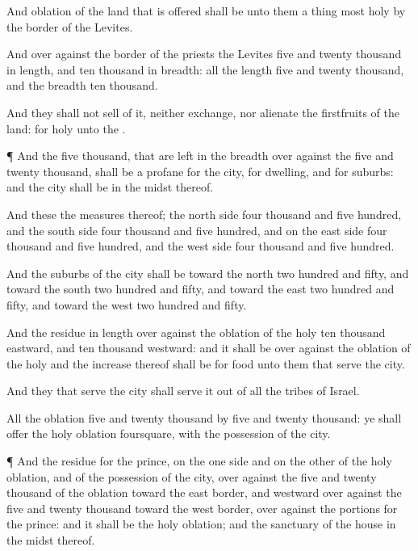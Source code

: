 {And
{}
oblation of the
land that is
offered shall be unto them a thing
most
holy by the
border of the
Levites.

And over
against the
border of the
priests the
Levites
{}
five and
twenty
thousand in
length, and
ten
thousand in
breadth: all the
length
{}
five and
twenty
thousand, and the
breadth
ten
thousand.

And they shall not
sell of it, neither
exchange, nor
alienate the
firstfruits of the
land: for
{}
holy unto the
{}.


\par }{\PP {}¶ And the
five
thousand, that are
left in the
breadth over
against the
five and
twenty
thousand, shall be a
profane
{} for the
city, for
dwelling, and for
suburbs: and the
city shall be in the
midst thereof.

And these
{} the
measures thereof; the
north
side
four
thousand and
five
hundred, and the
south
side
four
thousand and
five
hundred, and on the
east
side
four
thousand and
five
hundred, and the
west
side
four
thousand and
five
hundred.

And the
suburbs of the
city shall be toward the
north two
hundred and
fifty, and toward the
south two
hundred and
fifty, and toward the
east two
hundred and
fifty, and toward the
west two
hundred and
fifty.

And the
residue in
length over
against the
oblation of the
holy
{}
ten
thousand
eastward, and
ten
thousand
westward: and it shall be over
against the
oblation of the
holy
{} and the
increase thereof shall be for
food unto them that
serve the
city.

And they that
serve the
city shall
serve it out of all the
tribes of
Israel.

All the
oblation
{}
five and
twenty
thousand by
five and
twenty
thousand: ye shall
offer the
holy
oblation
foursquare, with the
possession of the
city.


\par }{\PP {}¶ And the
residue
{} for the
prince, on the one side and on the other of the
holy
oblation, and of the
possession of the
city, over
against the
five and
twenty
thousand of the
oblation toward the
east
border, and
westward over
against the
five and
twenty
thousand toward the
west
border, over
against the
portions for the
prince: and it shall be the
holy
oblation; and the
sanctuary of the
house
{} in the
midst thereof.

}
